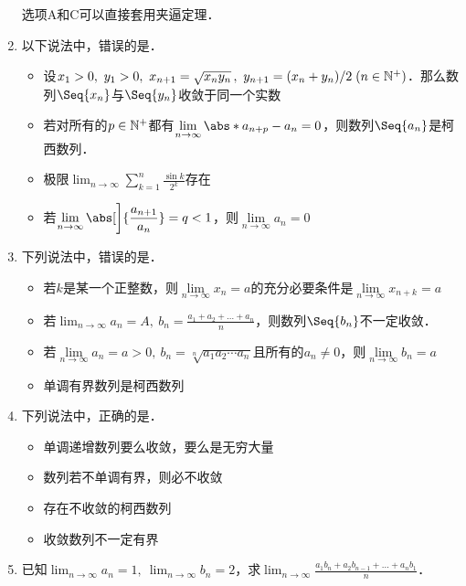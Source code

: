 \documentclass[a4paper,punct=CCT]{ctexbook}
\theoremstyle{definition}
\theoremstyle{remark}
\newif\ifshowsol
\begin{document}
\begin{enumerate}
  选项A和C可以直接套用夹逼定理．
  \fi

\item 以下说法中，错误的是\uline{\makebox[10em]{}}．
  \begin{itemize}
    \renewcommand{\labelitemi}{\faCircleThin}
    \addtolength{\itemsep}{1ex}
  \item 设\(x_1 > 0,\ y_1 > 0,\ x_{n+1} = \sqrt{x_n y_n}\,,\ y_{n+1} = (x_n+y_n)/2 \; (n \in \mathbb{N}^+)\)．那么数列\(\Seq{x_n}\)与\(\Seq{y_n}\)收敛于同一个实数
    \ifshowsol
  \item[\faCircle]
    \else
  \item
    \fi
    若对所有的\(p \in \mathbb{N}^+\)都有\(\lim\limits_{n\to\infty} \abs*{a_{n+p}-a_n} = 0\)，则数列\(\Seq{a_n}\)是柯西数列． %
  \item 极限\(\displaystyle \lim_{n\to\infty} \sum_{k=1}^n \frac{\sin k}{2^k}\)存在
  \item 若\(\displaystyle \lim_{n\to\infty} \abs[\bigg]{\frac{a_{n+1}}{a_n}} = q < 1\)，则\(\lim\limits_{n\to\infty} a_n = 0\)
  \end{itemize}

\item 下列说法中，错误的是\uline{\makebox[10em]{}}．
  \begin{itemize}
    \renewcommand{\labelitemi}{\faCircleThin}
    \addtolength{\itemsep}{.67ex}
  \item 若\(k\)是某一个正整数，则\(\lim\limits_{n\to\infty} x_n = a\)的充分必要条件是\(\lim\limits_{n\to\infty} x_{n+k} = a\)
    \ifshowsol
  \item[\faCircle]
    \else
  \item
    \fi
    若\(\displaystyle \lim_{n\to\infty} a_n = A,\ b_n = \frac{a_1 + a_2 + \dots + a_n}{n}\)，则数列\(\Seq{b_n}\)不一定收敛．
  \item 若\(\lim\limits_{n\to\infty} a_n = a > 0,\ b_n = \sqrt[n]{a_1 a_2 \dotsm a_n}\)且所有的\(a_n \ne 0\)，则\(\lim\limits_{n\to\infty} b_n = a\)
  \item 单调有界数列是柯西数列
  \end{itemize}

\item 下列说法中，正确的是\uline{\makebox[10em]{}}．
  \begin{itemize}
    \renewcommand{\labelitemi}{\faCircleThin}
    \ifshowsol
  \item[\faCircle]
    \else
  \item
    \fi
    单调递增数列要么收敛，要么是无穷大量
  \item 数列若不单调有界，则必不收敛
  \item 存在不收敛的柯西数列
  \item 收敛数列不一定有界
  \end{itemize}

\item 已知\(\displaystyle \lim_{n\to\infty} a_n = 1,\ \lim_{n\to\infty} b_n = 2\)，求\(\displaystyle \lim_{n\to\infty} \frac{a_1 b_n + a_2 b_{n-1} + \dots + a_n b_1}{n}\)．

  \ifshowsol
  可以模仿例\ref{eg:limavg}的思路来证明这个极限的值是\(2\)．
  \fi
\end{enumerate}
\fi
\end{document}
